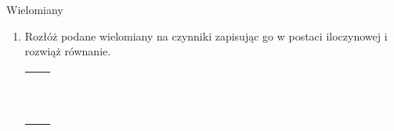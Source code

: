 \documentclass[12pt,a4paper]{article}
\begin{document}
	\begin{center}
		\LARGE Wielomiany
	\end{center}
	\vspace{1cm}
	
	
	\begin{enumerate}[1.]
		\item Rozłóż podane wielomiany na czynniki zapisując go w postaci iloczynowej i rozwiąż równanie.
		
		\begin{enumerate}[1)] \begin{tabular}{p{7cm} p{7cm}} 
				\item $4x^2-2x^4+6x^3=0$		& \vspace{0.4cm} \item $9x^2-16=0$ \\
				\item $6x^3-12x^2+18x=0$		& \item $9x^2-30x+25=0$ \\
				\item $x^4-10x^2+25$			& \item $7x^3+2x^2-21x-6=0$ \\
				\item $ x^3+4x^2-2x-8=0$		& \item $2x^5+3x^4-2x-3=0$ \\
				\item $x^6-7x^3-8=0$			& \item $8x^5-32x^3-x^2+4=0$ \\
				\item $19x^3+9x^2-18x-9=0$		& \item $x^3+4x^2+x-6=0$ \\
				\item $x^3+7x^2+4x-12=0$		& \item $x^3-x+6=0$ \\
				\item $x^4+3x^3-15x^2-19x+30=0$	& \item $4x^4-12x^3+25x^2-48x+36=0$ \\
				\item $x^3+4x^2-2x-8=0$			& \item $x^3-9x^2+23x-15=0$ \\
				\item $x^3+12x^2+44x+48=0$		& \item $x^3+9x^2+23x+15=0$ \\
				\item $x^7-17x^6+16x^5=0$		& \item $x^8+x^4-2=0$ \\

\end{tabular}
\end{enumerate}
\end{enumerate}
\end{document}
